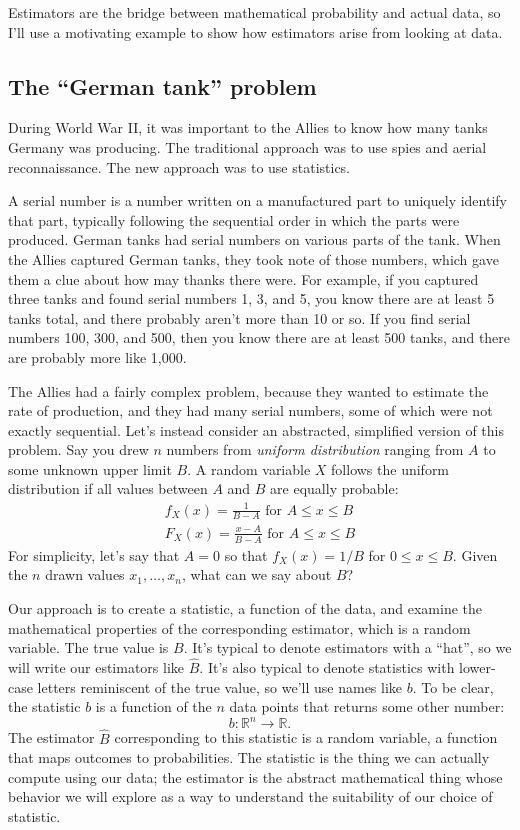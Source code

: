 Estimators are the bridge between mathematical probability and actual data, so
I'll use a motivating example to show how estimators arise from looking at data.

\subsection{The ``German tank'' problem}

During World War II, it was important to the Allies to know how many tanks
Germany was producing. The traditional approach was to use spies and aerial
reconnaissance. The new approach was to use statistics.

A serial number is a number written on a manufactured part to uniquely identify
that part, typically following the sequential order in which the parts were
produced. German tanks had serial numbers on various parts of the tank.  When
the Allies captured German tanks, they took note of those numbers, which gave
them a clue about how may thanks there were. For example, if you captured three
tanks and found serial numbers 1, 3, and 5, you know there are at least 5 tanks
total, and there probably aren't more than 10 or so. If you find serial numbers
100, 300, and 500, then you know there are at least 500 tanks, and there are
probably more like 1,000.

The Allies had a fairly complex problem, because they wanted to estimate the
rate of production, and they had many serial numbers, some of which were not
exactly sequential. Let's instead consider an abstracted, simplified version of
this problem. Say you drew $n$ numbers from \emph{uniform distribution} ranging
from $A$ to some unknown upper limit $B$. A random variable $X$ follows the
uniform distribution if all values between $A$ and $B$ are equally probable:
\begin{gather*}
    f_X(x) = \frac{1}{B-A} \text{ for } A \leq x \leq B \\
    F_X(x) = \frac{x-A}{B-A} \text{ for } A \leq x \leq B
\end{gather*}
For simplicity, let's say that $A=0$ so that $f_X(x) = 1/B$ for $0 \leq x \leq B$.
Given the $n$ drawn values $x_1, \ldots, x_n$, what can we say about $B$?

Our approach is to create a statistic, a function of the data, and examine the
mathematical properties of the corresponding estimator, which is a random
variable. The true value is $B$. It's typical to denote estimators with a
``hat'', so we will write our estimators like $\hat{B}$. It's also typical to denote
statistics with lower-case letters reminiscent of the true value, so we'll
use names like $b$. To be clear, the statistic $b$ is a function of
the $n$ data points that returns some other number:
\begin{equation*}
b : \mathbb{R}^n \to \mathbb{R}.
\end{equation*}
The estimator $\hat{B}$ corresponding to this statistic is a random variable,
a function that maps outcomes to probabilities. The statistic is the thing
we can actually compute using our data; the estimator is the abstract mathematical
thing whose behavior we will explore as a way to understand the suitability
of our choice of statistic.

